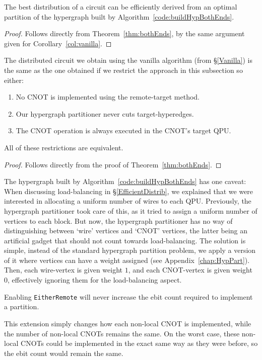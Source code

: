 \begin{corollary}
The best distribution of a circuit can be efficiently derived from an optimal partition of the hypergraph built by Algorithm~\ref{code:buildHypBothEnds}.
\label{col:bothEnds}
\end{corollary}
\begin{proof}
Follows directly from Theorem~\ref{thm:bothEnds}, by the same argument given for Corollary~\ref{col:vanilla}. 

\end{proof}

\begin{corollary}
The distributed circuit we obtain using the vanilla algorithm (from \S\ref{Vanilla}) is the same as the one obtained if we restrict the approach in this subsection so either:
\begin{enumerate}
  \renewcommand{\theenumi}{\alph{enumi})}
  \item No CNOT is implemented using the remote-target method.
  \item Our hypergraph partitioner never cuts target-hyperedges.
  \item The CNOT operation is always executed in the CNOT's target QPU.
\end{enumerate}
All of these restrictions are equivalent.
\end{corollary}
\begin{proof}
Follows directly from the proof of Theorem~\ref{thm:bothEnds}.

\end{proof}

The hypergraph built by Algorithm~\ref{code:buildHypBothEnds} has one caveat: When discussing load-balancing in \S\ref{EfficientDistrib}, we explained that we were interested in allocating a uniform number of wires to each QPU. Previously, the hypergraph partitioner took care of this, as it tried to assign a uniform number of vertices to each block. But now, the hypergraph partitioner has no way of distinguishing between `wire' vertices and `CNOT' vertices, the latter being an artificial gadget that should not count towards load-balancing. The solution is simple, instead of the standard hypergraph partition problem, we apply a version of it where vertices can have a weight assigned (see Appendix~\ref{chap:HypPart}). Then, each wire-vertex is given weight \(1\), and each CNOT-vertex is given weight \(0\), effectively ignoring them for the load-balancing aspect.

\begin{remark} 
Enabling \texttt{EitherRemote} will never increase the ebit count required to implement a partition.

\normalfont
This extension simply changes how each non-local CNOT is implemented, while the number of non-local CNOTs remains the same. On the worst case, these non-local CNOTs could be implemented in the exact same way as they were before, so the ebit count would remain the same.

\label{thm:BothEndsImprove}
\end{remark}

